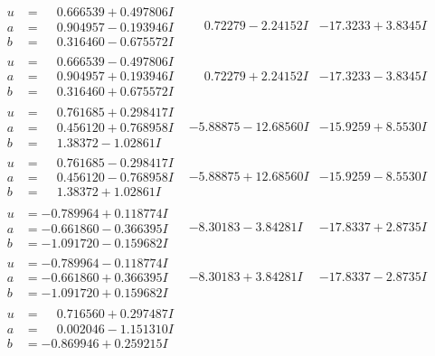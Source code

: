 \documentclass[1p]{elsarticle_modified}
\theoremstyle{definition}
\begin{document}
$$\begin{array}{c|c|c}
\begin{aligned}
u &= \phantom{-}0.666539 + 0.497806 I \\
a &= \phantom{-}0.904957 - 0.193946 I \\
b &= \phantom{-}0.316460 - 0.675572 I\end{aligned}
 & \phantom{-}0.72279 - 2.24152 I & -17.3233 + 3.8345 I \\ \hline\begin{aligned}
u &= \phantom{-}0.666539 - 0.497806 I \\
a &= \phantom{-}0.904957 + 0.193946 I \\
b &= \phantom{-}0.316460 + 0.675572 I\end{aligned}
 & \phantom{-}0.72279 + 2.24152 I & -17.3233 - 3.8345 I \\ \hline\begin{aligned}
u &= \phantom{-}0.761685 + 0.298417 I \\
a &= \phantom{-}0.456120 + 0.768958 I \\
b &= \phantom{-}1.38372 - 1.02861 I\end{aligned}
 & -5.88875 - 12.68560 I & -15.9259 + 8.5530 I \\ \hline\begin{aligned}
u &= \phantom{-}0.761685 - 0.298417 I \\
a &= \phantom{-}0.456120 - 0.768958 I \\
b &= \phantom{-}1.38372 + 1.02861 I\end{aligned}
 & -5.88875 + 12.68560 I & -15.9259 - 8.5530 I \\ \hline\begin{aligned}
u &= -0.789964 + 0.118774 I \\
a &= -0.661860 - 0.366395 I \\
b &= -1.091720 - 0.159682 I\end{aligned}
 & -8.30183 - 3.84281 I & -17.8337 + 2.8735 I \\ \hline\begin{aligned}
u &= -0.789964 - 0.118774 I \\
a &= -0.661860 + 0.366395 I \\
b &= -1.091720 + 0.159682 I\end{aligned}
 & -8.30183 + 3.84281 I & -17.8337 - 2.8735 I \\ \hline\begin{aligned}
u &= \phantom{-}0.716560 + 0.297487 I \\
a &= \phantom{-}0.002046 - 1.151310 I \\
b &= -0.869946 + 0.259215 I\end{aligned}

\end{array}$$
\end{document}

